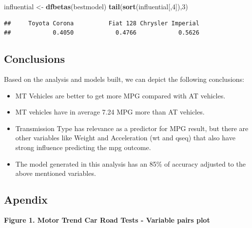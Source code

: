 \documentclass[]{article}
\newenvironment{Shaded}{\begin{snugshade}}{\end{snugshade}}
\newcommand{\KeywordTok}[1]{\textcolor[rgb]{0.13,0.29,0.53}{\textbf{{#1}}}}
\newcommand{\DataTypeTok}[1]{\textcolor[rgb]{0.13,0.29,0.53}{{#1}}}
\newcommand{\DecValTok}[1]{\textcolor[rgb]{0.00,0.00,0.81}{{#1}}}
\newcommand{\StringTok}[1]{\textcolor[rgb]{0.31,0.60,0.02}{{#1}}}
\newcommand{\NormalTok}[1]{{#1}}
\begin{document}
\begin{Shaded}
\begin{Highlighting}[]
\NormalTok{influential <-}\StringTok{ }\KeywordTok{dfbetas}\NormalTok{(bestmodel)}
\KeywordTok{tail}\NormalTok{(}\KeywordTok{sort}\NormalTok{(influential[,}\DecValTok{4}\NormalTok{]),}\DecValTok{3}\NormalTok{)}
\end{Highlighting}
\end{Shaded}

\begin{verbatim}
##     Toyota Corona          Fiat 128 Chrysler Imperial 
##            0.4050            0.4766            0.5626
\end{verbatim}

\subsection{Conclusions}\label{conclusions}

Based on the analysis and models built, we can depict the following
conclusions:

\begin{itemize}
\itemsep1pt\parskip0pt
\item
  MT Vehicles are better to get more MPG compared with AT vehicles.
\item
  MT vehicles have in average 7.24 MPG more than AT vehicles.
\item
  Transmission Type has relevance as a predictor for MPG result, but
  there are other variables like Weight and Acceleration (wt and qseq)
  that also have strong influence predicting the mpg outcome.
\item
  The model generated in this analysis has an 85\% of accuracy adjusted
  to the above mentioned variables.
\end{itemize}

\subsection{Apendix}\label{apendix}

\textbf{Figure 1. Motor Trend Car Road Tests - Variable pairs plot}

\begin{Shaded}
\end{Shaded}
\end{document}
